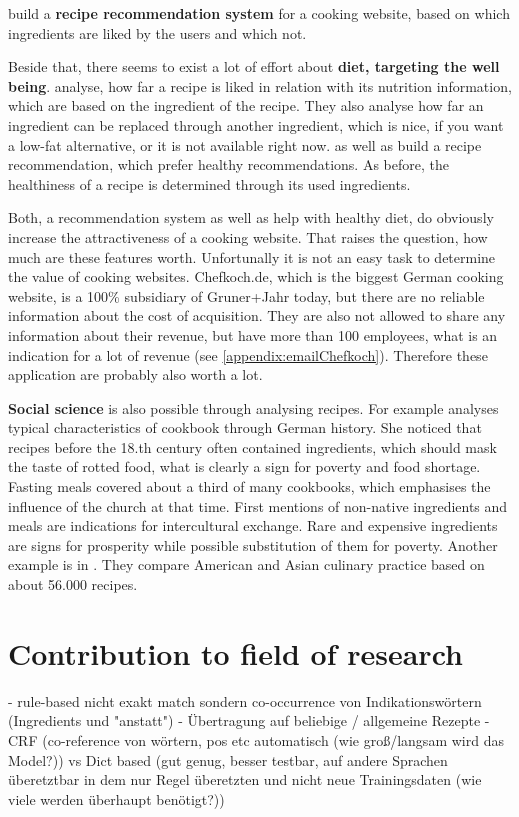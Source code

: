 \documentclass[12pt, twoside]{report}
\begin{document}
\parencite{recipeRecommendation} build a \textbf{recipe recommendation system} for a cooking website, based on which ingredients are liked by the users and which not.

Beside that, there seems to exist a lot of effort about \textbf{diet, targeting the well being}. \parencite{ingredientNetworks} analyse, how far a recipe is liked in relation with its nutrition information, which are based on the ingredient of the recipe. They also analyse how far an ingredient can be replaced through another ingredient, which is nice, if you want a low-fat alternative, or it is not available right now. \parencite{Freyne2010} as well as \parencite{Geleijnse_extractingvegetable} build a recipe recommendation, which prefer healthy recommendations. As before, the healthiness of a recipe is determined through its used ingredients.

Both, a recommendation system as well as help with healthy diet, do obviously increase the attractiveness of a cooking website. That raises the question, how much are these features worth. Unfortunally it is not an easy task to determine the value of cooking websites. Chefkoch.de, which is the biggest German cooking website, is a 100\% subsidiary of Gruner+Jahr today, but there are no reliable information about the cost of acquisition. They are also not allowed to share any information about their revenue, but have more than 100 employees, what is an indication for a lot of revenue (see \cref{appendix:emailChefkoch}). Therefore these application are probably also worth a lot.


\textbf{Social science} is also possible through analysing recipes. For example \parencite{BeateHenning} analyses typical characteristics of cookbook through German history. She noticed that recipes before the 18.th century often contained ingredients, which should mask the taste of rotted food, what is clearly a sign for poverty and food shortage. Fasting meals covered about a third of many cookbooks, which emphasises the influence of the church at that time. First mentions of non-native ingredients and meals are indications for intercultural exchange. Rare and expensive ingredients are signs for prosperity while possible substitution of them for poverty. Another example is in \parencite{FlavorNetwork}. They compare American and Asian culinary practice based on about 56.000 recipes.


\section{Contribution to field of research}
- rule-based nicht exakt match sondern co-occurrence von Indikationswörtern (Ingredients und "anstatt")
- Übertragung auf beliebige / allgemeine Rezepte
-CRF (co-reference von wörtern, pos etc automatisch (wie groß/langsam wird das Model?)) vs Dict based (gut genug, besser testbar, auf andere Sprachen überetztbar in dem nur Regel überetzten und nicht neue Trainingsdaten (wie viele werden überhaupt benötigt?))
\end{document}
